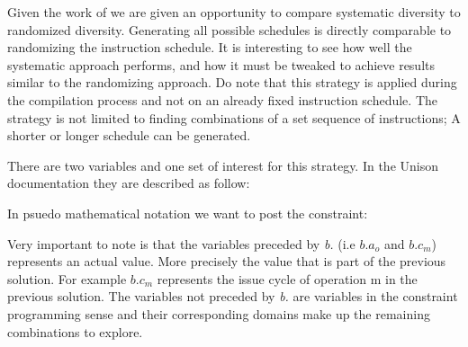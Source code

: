 Given the work of \textcite{large-scale-automated} we are given an opportunity to compare
systematic diversity to randomized diversity. Generating all possible schedules is directly
comparable to randomizing the instruction schedule. It is interesting to see how well
the systematic approach performs, and how it must be tweaked to achieve results similar
to the randomizing approach. Do note that this strategy is applied during the compilation
process and not on an already fixed instruction schedule. The strategy is not limited to
finding combinations of a set sequence of instructions; A shorter or longer schedule can
be generated.

There are two variables and one set of interest for this strategy. In the Unison documentation
they are described as follow:

\vspace{0.2cm}

\noindent{}

\vspace{0.2cm}


In psuedo mathematical notation we want to post the constraint:

\vspace{0.2cm}
\noindent{}
\vspace{0.2cm}

Very important to note is that the variables preceded by \textit{b.} (i.e $b.a_o$ and
$b.c_m$) represents an actual value. More precisely the value that is part of the previous
solution. For example $b.c_m$ represents the issue cycle of operation m in the previous
solution. The variables not preceded by \textit{b.} are variables in the constraint
programming sense and their corresponding domains make up the remaining combinations to
explore.

